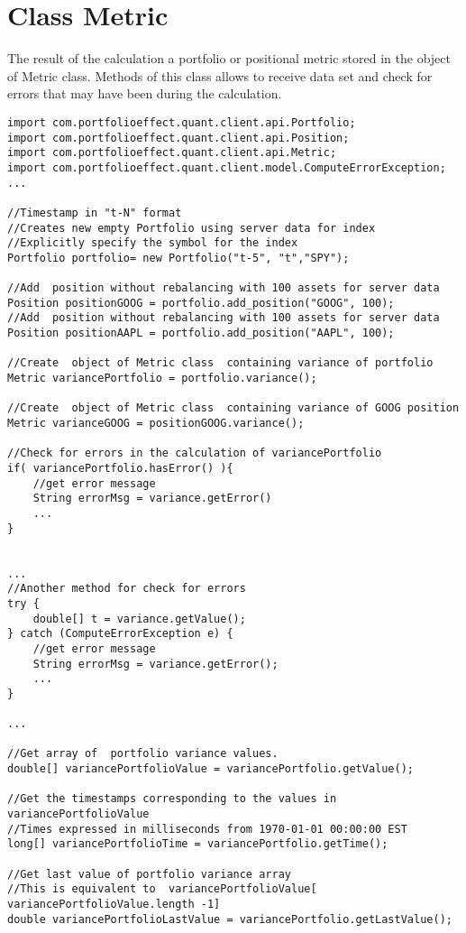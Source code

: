\documentclass[letterpaper]{report}
\newcounter{N}
\begin{document}
\section{Class Metric}
The result of the calculation a portfolio or positional metric stored in the  object of Metric class.
Methods of this class allows  to receive data set and check for errors that may have been during the calculation.
\begin{lstlisting}
import com.portfolioeffect.quant.client.api.Portfolio;
import com.portfolioeffect.quant.client.api.Position;
import com.portfolioeffect.quant.client.api.Metric;
import com.portfolioeffect.quant.client.model.ComputeErrorException;
...

//Timestamp in "t-N" format
//Creates new empty Portfolio using server data for index
//Explicitly specify the symbol for the index 
Portfolio portfolio= new Portfolio("t-5", "t","SPY");

//Add  position without rebalancing with 100 assets for server data
Position positionGOOG = portfolio.add_position("GOOG", 100);
//Add  position without rebalancing with 100 assets for server data
Position positionAAPL = portfolio.add_position("AAPL", 100);

//Create  object of Metric class  containing variance of portfolio
Metric variancePortfolio = portfolio.variance();

//Create  object of Metric class  containing variance of GOOG position 
Metric varianceGOOG = positionGOOG.variance();

//Check for errors in the calculation of variancePortfolio
if( variancePortfolio.hasError() ){
	//get error message 
	String errorMsg = variance.getError()
	...
}


...
//Another method for check for errors
try {
	double[] t = variance.getValue();
} catch (ComputeErrorException e) {
	//get error message 
	String errorMsg = variance.getError();
	...
}
		
...

//Get array of  portfolio variance values.
double[] variancePortfolioValue = variancePortfolio.getValue();

//Get the timestamps corresponding to the values in variancePortfolioValue
//Times expressed in milliseconds from 1970-01-01 00:00:00 EST
long[] variancePortfolioTime = variancePortfolio.getTime();

//Get last value of portfolio variance array
//This is equivalent to  variancePortfolioValue[ variancePortfolioValue.length -1]
double variancePortfolioLastValue = variancePortfolio.getLastValue();


\end{lstlisting}
\end{document}
